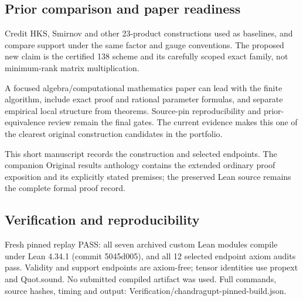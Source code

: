 \documentclass[11pt,a4paper]{article}
\begin{document}
\subsection{Prior comparison and paper readiness}
Credit HKS, Smirnov and other 23-product constructions used as baselines, and compare support under the same factor and gauge conventions. The proposed new claim is the certified 138 scheme and its carefully scoped exact family, not minimum-rank matrix multiplication.

\begin{samepage}
A focused algebra/computational mathematics paper can lead with the finite algorithm, include exact proof and rational parameter formulas, and separate empirical local structure from theorems. Source-pin reproducibility and prior-equivalence review remain the final gates. The current evidence makes this one of the clearest original construction candidates in the portfolio.

\end{samepage}
{\small This short manuscript records the construction and selected endpoints. The companion Original results anthology contains the extended ordinary proof exposition and its explicitly stated premises; the preserved Lean source remains the complete formal proof record.\par}

\subsection{Verification and reproducibility}
Fresh pinned replay PASS: all seven archived custom Lean modules compile under Lean 4.34.1 (commit 5045d005), and all 12 selected endpoint axiom audits pass. Validity and support endpoints are axiom-free; tensor identities use propext and Quot.sound. No submitted compiled artifact was used. Full commands, source hashes, timing and output: Verification/chandragupt-pinned-build.json.
\end{document}

